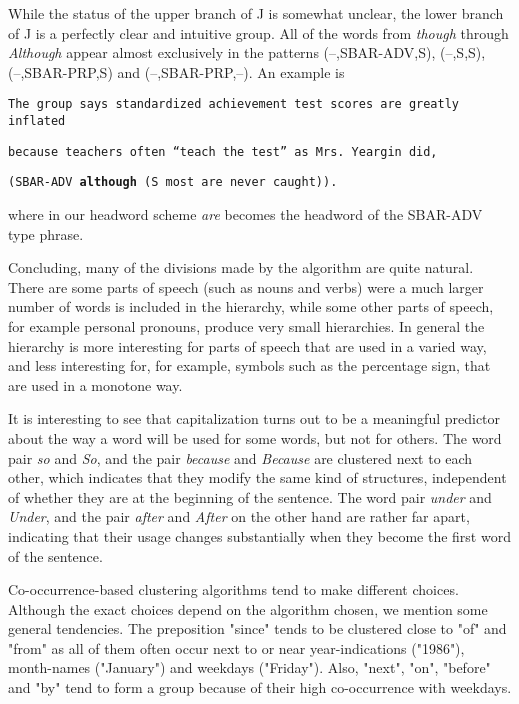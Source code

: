 While the status of the upper branch of J is somewhat unclear, the lower branch
of J is a perfectly clear and intuitive group. All of the words from {\em
  though} through {\em Although} appear almost exclusively in the patterns
(--,SBAR-ADV,S), (--,S,S), (--,SBAR-PRP,S) and (--,SBAR-PRP,--). An example is

\hspace*{4mm}
{\tt The group says standardized achievement test scores are greatly inflated}

\hspace*{4mm}
{\tt because teachers often ``teach the test'' as Mrs. Yeargin did,}

\hspace*{4mm}
{\tt (SBAR-ADV {\bf although} (S most are never caught)). }

\noindent
where in our headword scheme {\em are} becomes the headword of the SBAR-ADV type
phrase.

Concluding, many of the divisions made by the algorithm are quite natural. There
are some parts of speech (such as nouns and verbs) were a much larger number of
words is included in the hierarchy, while some other parts of speech, for
example personal pronouns, produce very small hierarchies. In general the
hierarchy is more interesting for parts of speech that are used in a varied way,
and less interesting for, for example, symbols such as the percentage sign, that
are used in a monotone way.

It is interesting to see that capitalization turns out to be a meaningful
predictor about the way a word will be used for some words, but not for others.
The word pair {\em so} and {\em So}, and the pair {\em because} and {\em
  Because} are clustered next to each other, which indicates that they modify
the same kind of structures, independent of whether they are at the beginning of
the sentence.  The word pair {\em under} and {\em Under}, and the pair {\em
  after} and {\em After} on the other hand are rather far apart, indicating that
their usage changes substantially when they become the first word of the
sentence.

Co-occurrence-based clustering algorithms tend to make different
choices. Although the exact choices depend on the algorithm chosen, we
mention some general tendencies. The preposition "since" tends to be
clustered close to "of" and "from" as all of them often occur next to
or near year-indications ("1986"), month-names ("January") and
weekdays ("Friday"). Also, "next", "on", "before" and "by" tend to
form a group because of their high co-occurrence with weekdays.

